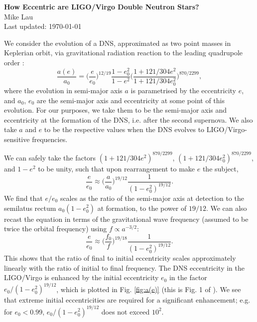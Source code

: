 \documentclass[12pt]{article}
\begin{document}
	
\begin{center}
\Large{\textbf{How Eccentric are LIGO/Virgo Double Neutron Stars?}} \\
\vspace{1cm}
\large{Mike Lau} \\
Last updated: \today
\end{center}

We consider the evolution of a \ac{DNS}, approximated as two point masses in Keplerian orbit, via gravitational radiation reaction to the leading quadrupole order \citep{Peters1964}:
\begin{equation}
\frac{a(e)}{a_0} = \bigg(\frac{e}{e_0}\bigg)^{12/19}
		\frac{1-e_0^2}{1-e^2}
		\bigg( \frac{1+121/304 e^2}{1+121/304e_0^2}\bigg)^{870/2299},
\end{equation}
where the evolution in semi-major axis $a$ is parametrised by the eccentricity $e$, and $a_0$, $e_0$ are the semi-major axis and eccentricity at some point of this evolution. For our purposes, we take them to be the semi-major axis and eccentricity at the formation of the \ac{DNS}, i.e. after the second supernova. We also take $a$ and $e$ to be the respective values when the \ac{DNS} evolves to LIGO/Virgo-sensitive frequencies.

We can safely take the factors $(1+121/304e^2)^{870/2299}$, $(1+121/304e_0^2)^{870/2299}$, and $1-e^2$ to be unity, such that upon rearrangement to make $e$ the subject,
\begin{equation}
\frac{e}{e_0} \approx \bigg(\frac{a}{a_0}\bigg)^{19/12}
\frac{1}{(1-e_0^2)^{19/12}}.
\end{equation}
We find that $e/e_0$ scales as the ratio of the semi-major axis at detection to the semilatus rectum $a_0(1-e_0^2)$ at formation, to the power of $19/12$. We can also recast the equation in terms of the gravitational wave frequency (assumed to be twice the orbital frequency) using $f\propto a^{-3/2}$:
\begin{equation}
\frac{e}{e_0} \approx \bigg(\frac{f_0}{f}\bigg)^{19/18}
\frac{1}{(1-e_0^2)^{19/12}}.
\end{equation}
This shows that the ratio of final to initial eccentricity scales approximately linearly with the ratio of initial to final frequency. The \ac{DNS} eccentricity in the LIGO/Virgo is enhanced by the initial eccentricity $e_0$ in the factor $e_0/(1-e_0^2)^{19/12}$, which is plotted in Fig. \ref{fig:a(e)} (this is Fig. 1 of \cite{Peters1964}). We see that extreme initial eccentricities are required for a significant enhancement; e.g. for $e_0<0.99$, $e_0/(1-e_0^2)^{19/12}$ does not exceed $10^2$.
\end{document}
